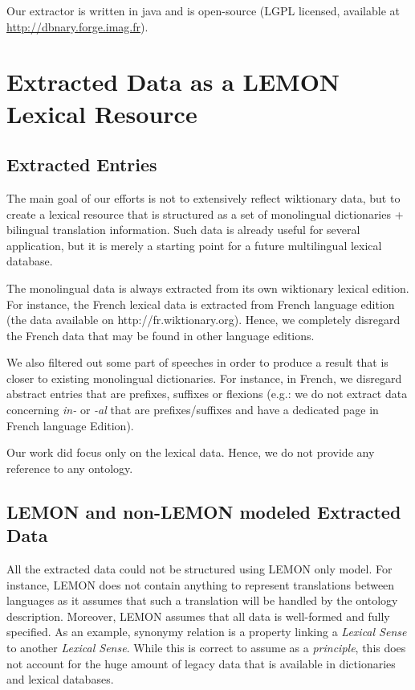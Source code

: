 \documentclass[10pt, a4paper]{article}
\begin{document}
Our extractor is written in java and is open-source (LGPL licensed, available at \url{http://dbnary.forge.imag.fr}).
\section{Extracted Data as a LEMON Lexical Resource}

\subsection{Extracted Entries}

The main goal of our efforts is not to extensively reflect wiktionary data, but to create a lexical resource that is structured as a set of monolingual dictionaries + bilingual translation information. Such data is already useful for several application, but it is merely a starting point for a future multilingual lexical database.

The monolingual data is always extracted from its own wiktionary lexical edition. For instance, the French lexical data is extracted from French language edition (the data available on http://fr.wiktionary.org). Hence, we completely disregard the French data that may be found in other language editions.

We also filtered out some part of speeches in order to produce a result that is closer to existing monolingual dictionaries. For instance, in French, we disregard abstract entries that are prefixes, suffixes or flexions (e.g.: we do not extract data concerning \textit{in-} or \textit{-al} that are prefixes/suffixes and have a dedicated page in French language Edition). 

Our work did focus only on the lexical data. Hence, we do not provide any reference to any ontology.  

\subsection{LEMON and non-LEMON modeled Extracted Data}

All the extracted data could not be structured using LEMON only model. For instance, LEMON does not contain anything to represent translations between languages as it assumes that such a translation will be handled by the ontology description. Moreover, LEMON assumes that all data is well-formed and fully specified. As an example, synonymy relation is a property linking a \textit{Lexical Sense} to another \textit{Lexical Sense}. While this is correct to assume as a \textit{principle}, this does not account for the huge amount of legacy data that is available in dictionaries and lexical databases.
\end{document}
